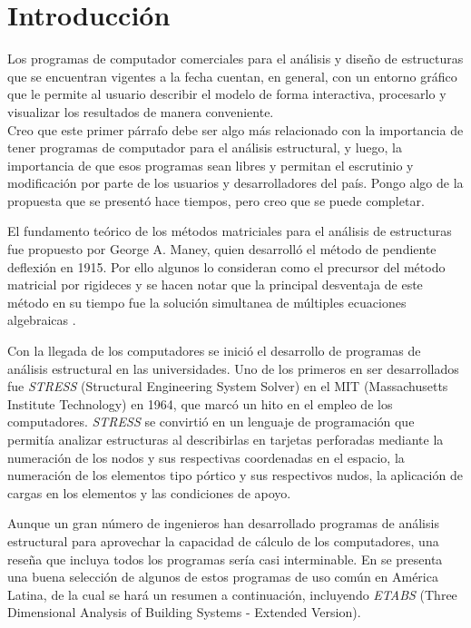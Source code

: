 \chapter{Introducción}
\label{chap:antecedentes}

\begin{nota}
Los programas de computador comerciales para el análisis y diseño de estructuras que se encuentran vigentes a la fecha cuentan, en general, con un entorno gráfico que le permite al usuario describir el modelo de forma interactiva, procesarlo y visualizar los resultados de manera conveniente.\\
\tcblower
Creo que este primer párrafo debe ser algo más relacionado con la importancia de tener programas de computador para el análisis estructural, y luego, la importancia de que esos programas sean libres y permitan el escrutinio y modificación por parte de los usuarios y desarrolladores del país. Pongo algo de la propuesta que se presentó hace tiempos, pero creo que se puede completar.
\end{nota}

El fundamento teórico de los métodos matriciales para el análisis de estructuras fue propuesto por George A. Maney, quien desarrolló el método de pendiente deflexión en 1915. Por ello algunos lo consideran como el precursor del método matricial por rigideces y se hacen notar que la principal desventaja de este método en su tiempo fue la solución simultanea de múltiples ecuaciones algebraicas \parencite{Kassimali2011}.

Con la llegada de los computadores se inició el desarrollo de programas de análisis estructural en las universidades. Uno de los primeros en ser desarrollados fue \emph{STRESS} (Structural Engineering System Solver) en el MIT (Massachusetts Institute Technology) en 1964, que marcó un hito en el empleo de los computadores. \emph{STRESS} se convirtió en un lenguaje de programación que permitía analizar estructuras al describirlas en tarjetas perforadas mediante la numeración de los nodos y sus respectivas coordenadas en el espacio, la numeración de los elementos tipo pórtico y sus respectivos nudos, la aplicación de cargas en los elementos y las condiciones de apoyo.

Aunque un gran número de ingenieros han desarrollado programas de análisis estructural para aprovechar la capacidad de cálculo de los computadores, una reseña que incluya todos los programas sería casi interminable. En \textcite{escamilla1995microcomputadores} se presenta una buena selección de algunos de estos programas de uso común en América Latina, de la cual se hará un resumen a continuación, incluyendo \emph{ETABS} (Three Dimensional Analysis of Building Systems - Extended Version).\\

